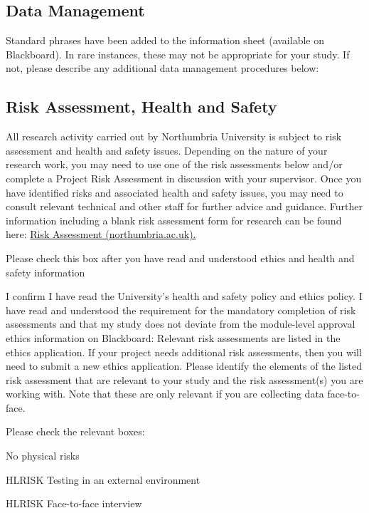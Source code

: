 \documentclass[../CHEFCookingHelperForEveryonesFridge.tex]{subfiles}
\begin{document}
\subsection{Data Management}
Standard phrases have been added to the information sheet (available on Blackboard). In rare instances,
these may not be appropriate for your study. If not,
please describe any additional data management procedures below:


\subsection{Risk Assessment, Health and Safety}
All research activity carried out by Northumbria University is subject to risk assessment and health and safety
issues. Depending on the nature of your research work, you may need to use one of the risk assessments below
and/or complete a Project Risk Assessment in discussion with your supervisor. Once you have identified risks
and associated health and safety issues, you may need to consult relevant technical and other staff for further
advice and guidance. Further information including a blank risk assessment form for research can be found here:
\href{https://www.northumbria.ac.uk/about-us/health-safety-resources/risk-assessment/}{Risk Assessment (northumbria.ac.uk).}

Please check this box after you have read and understood ethics and health and safety information

   I confirm I have read the University's health and safety policy and ethics policy.
I have read and understood the requirement for the mandatory completion of risk assessments and that my study
does not deviate from the module-level approval ethics information on Blackboard: Relevant risk assessments
are listed in the ethics application. If your project needs additional risk assessments, then you will need
to submit a new ethics application. Please identify the elements of the listed risk assessment that are relevant
to your study and the risk assessment(s) you are working with. Note that these are only relevant if you are
collecting data face-to-face.

Please check the relevant boxes:

   No physical risks

   HL\textunderscore RISK Testing in an external environment

   HL\textunderscore RISK Face-to-face interview
\end{document}
